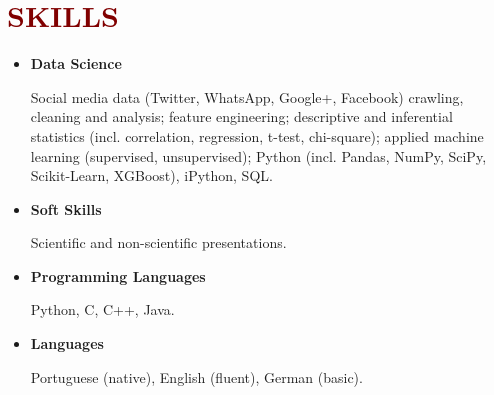 

\section*{\textcolor{maroon}{\normalsize SKILLS}}

\begin{itemize}[]


\item \textbf{Data Science} 

Social media data (Twitter, WhatsApp, Google+, Facebook) crawling, cleaning and analysis; feature engineering; descriptive and inferential statistics (incl. correlation, regression, t-test, chi-square); applied machine learning (supervised, unsupervised); Python (incl. Pandas, NumPy, SciPy, Scikit-Learn, XGBoost), iPython, SQL.

\item \textbf{Soft Skills} 

Scientific and non-scientific presentations.

\item \textbf{Programming Languages} 

Python, C, C++, Java.

\item \textbf{Languages} 

Portuguese (native), English (fluent), German (basic).

\end{itemize}


